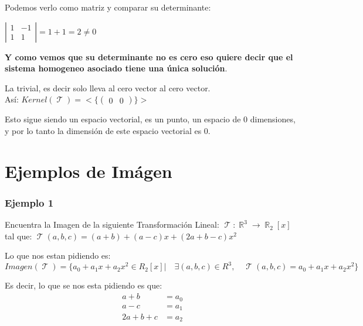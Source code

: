\documentclass[12pt]{report}                                    %
\DeclareMathOperator \Real {\mathbb{R}}                         %
\DeclareMathOperator \LinealTransformation {\mathcal{T}}        %
\DeclareMathOperator \LT {\mathcal{T}}                          %
\newcommand{\pVector}[1]{                                       %
        \ensuremath{\begin{pmatrix}#1\end{pmatrix}}                 %
    }
\newcommand{\Vector}[1]{                                        %
        \ensuremath{\begin{matrix}#1\end{matrix}}                   %
    }
\begin{document}
            Podemos verlo como matriz y comparar su determinante:

            $\left| \Vector{1&-1\\1&1} \right| = 1 + 1 = 2 \neq 0$

            \textbf{Y como vemos que su determinante no es cero eso quiere
            decir que el sistema homogeneo asociado tiene una única solución}.

            La trivial, es decir solo lleva al cero vector al cero vector.
            \\

            Así: $Kernel(\LT) =  < \{ \pVector{0&0} \} > $

            Esto sigue siendo un espacio vectorial, es un punto, un espacio de 0 dimensiones,
            y por lo tanto la dimensión de este espacio vectorial es 0.

    \clearpage
    \section{Ejemplos de Imágen}


            \subsubsection{Ejemplo 1}
            Encuentra la Imagen de la siguiente Transformación Lineal:
            $\LinealTransformation : \Real^3 \to \Real_2[x]$ tal que: 
            $\LinealTransformation(a,b,c) = (a+b) + (a-c)x + (2a+b-c)x^2$

            Lo que nos estan pidiendo es:
            \begin{equation*}
                Imagen(\LT) = \{a_0+a_1x+a_2x^2 \in R_2[x] |\quad \exists (a,b,c) \in R^3 ,\quad 
                \LinealTransformation(a,b,c) = a_0+a_1x+a_2x^2\}
            \end{equation*}

            Es decir, lo que se nos esta pidiendo es que:
            \begin{equation*}
            \begin{split}
                a + b           & = a_0 \\
                a - c           & = a_1 \\
                2a + b + c      & = a_2 \\
             \end{split}
            \end{equation*}
\end{document}

